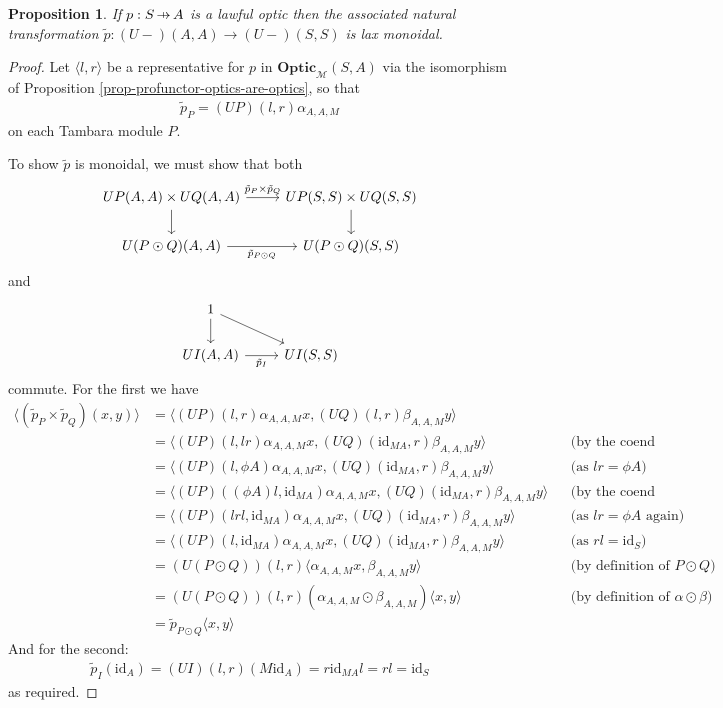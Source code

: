 \documentclass[11pt,a4paper]{article}
\theoremstyle{plain}
\newtheorem{proposition}[theorem]{Proposition}
\theoremstyle{definition}
\newcommand{\M}{\mathscr{M}}
\newcommand{\Optic}{\mathbf{Optic}}
\newcommand{\id}{\mathrm{id}}
\newcommand{\hto}{\ensuremath{\,\mathaccent\shortmid\rightarrow\,}}
\begin{document}
\begin{proposition}
If $p : S \hto A$ is a lawful optic then the associated natural transformation $\tilde{p} : (U-)(A,A) \to (U-)(S,S)$ is lax monoidal.
\end{proposition}
\begin{proof}
Let $\langle l, r \rangle$ be a representative for $p$ in $\Optic_\M(S,A)$ via the isomorphism of Proposition \ref{prop-profunctor-optics-are-optics}, so that
\begin{align*}
\tilde{p}_P = (UP)(l,r) \alpha_{A,A,M}
\end{align*}
on each Tambara module $P$.

To show $\tilde{p}$ is monoidal, we must show that both
\[
\begin{tikzcd}
UP(A,A) \times UQ(A,A) \ar[r, "\tilde{p}_P \times \tilde{p}_Q"] \ar[d, swap] & UP(S, S) \times UQ(S, S)  \ar[d] \\
U(P \odot Q)(A,A)  \ar[r, "\tilde{p}_{P \odot Q}", swap] & U(P \odot Q)(S,S)
\end{tikzcd}
\]
and
\[
\begin{tikzcd}
1 \ar[d] \ar[dr] & \\
UI(A,A)  \ar[r, "\tilde{p}_I", swap] & UI(S,S)
\end{tikzcd}
\]
commute. For the first we have
\begin{align*}
\langle (\tilde{p}_P \times \tilde{p}_Q)(x, y) \rangle &= \langle (UP)(l,r) \alpha_{A,A,M} x,  (UQ)(l,r) \beta_{A,A,M} y\rangle \\
&= \langle (UP)(l,lr) \alpha_{A,A,M} x, (UQ)(\id_{MA},r) \beta_{A,A,M} y\rangle && \text{(by the coend relations)} \\
&= \langle (UP)(l,\phi A) \alpha_{A,A,M} x, (UQ)(\id_{MA},r) \beta_{A,A,M} y\rangle && \text{(as $lr = \phi A$)} \\
&= \langle (UP)((\phi A)l,\id_{MA}) \alpha_{A,A,M} x, (UQ)(\id_{MA},r) \beta_{A,A,M} y\rangle && \text{(by the coend relations again)} \\
&= \langle (UP)(lrl,\id_{MA}) \alpha_{A,A,M} x, (UQ)(\id_{MA},r) \beta_{A,A,M} y\rangle && \text{(as $lr = \phi A$ again)} \\
&= \langle (UP)(l,\id_{MA}) \alpha_{A,A,M} x, (UQ)(\id_{MA},r) \beta_{A,A,M} y\rangle && \text{(as $rl = \id_S$)} \\
&= (U(P \odot Q))(l,r) \langle \alpha_{A,A,M} x, \beta_{A,A,M} y \rangle && \text{(by definition of $P \odot Q$)} \\
&= (U(P \odot Q))(l,r) (\alpha_{A,A,M} \odot \beta_{A,A,M}) \langle x, y \rangle && \text{(by definition of $\alpha \odot \beta$)} \\
&= \tilde{p}_{P \odot Q} \langle x, y \rangle
\end{align*}
And for the second:
\begin{align*}
\tilde{p}_I(\id_A) = (UI)(l,r) (M \id_A) = r \id_{MA} l = rl = \id_S
\end{align*}
as required.
\end{proof}
\end{document}
